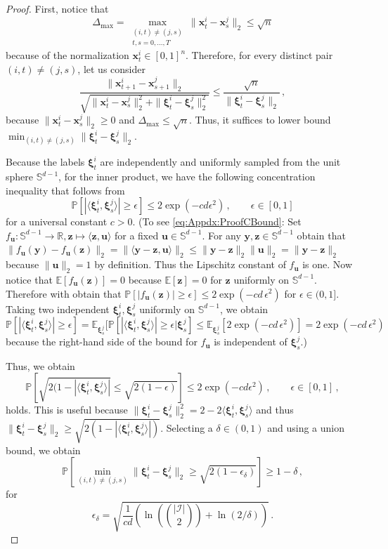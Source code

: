 \documentclass{article}
\theoremstyle{plain}
\theoremstyle{definition}
\theoremstyle{remark}
\newcommand{\bfxi}{{\bm \xi}}
\newcommand{\x}{\bm{x}}
\newcommand{\bfy}{\boldsymbol{y}}
\newcommand{\bfz}{\boldsymbol{z}}
\newcommand{\bfu}{\boldsymbol{u}}
\begin{document}
\begin{proof}
  First, notice that
  \[
    \Delta_{\text{max}} = \max_{\substack{(i, t) \neq (j, s)\\t,s = 0, \dots, T}} \|\x_t^i - \x_s^j\|_2 \leq \sqrt{n}
  \]
  because of the normalization $\x_t^i \in [0, 1]^n$.
  Therefore, for every distinct pair $(i, t) \neq (j, s)$, let us consider
  \[
    \frac{\|\x_{t + 1}^i - \x_{s + 1}^j\|_2}{ \sqrt{\|\x_t^i - \x_s^j\|_2^2 + \|\bfxi_t^i - \bfxi_s^j\|_2^2}} \leq \frac{\sqrt{n}}{\|\bfxi_t^i - \bfxi_s^j\|_2}\,,
  \]
  because $\|\x_t^i - \x_s^j\|_2 \geq 0$ and $\Delta_{\text{max}} \leq \sqrt{n}$. Thus, it suffices to lower bound $\min_{(i, t) \neq (j, s)} \|\bfxi_t^i - \bfxi_s^j\|_2$.

  Because the labels $\bfxi_t^i$ are independently and uniformly sampled from the unit sphere $\mathbb{S}^{d - 1}$, for the inner product, we have the following concentration inequality  that follows from \citep[Exercise~5.1.12]{Vershynin2018}
  \begin{equation}
    \label{eq:Appdx:ProofCBound}
    \mathbb{P}[|\langle \bfxi_t^i, \bfxi_s^j\rangle | \geq \epsilon] \leq 2 \exp\left(-cd \epsilon^2\right)\,,\qquad \epsilon \in [0, 1]
  \end{equation}
  for a universal constant $c > 0$. (To see \eqref{eq:Appdx:ProofCBound}: Set $f_{\bfu}: \mathbb{S}^{d - 1} \to \mathbb{R}, \bfz \mapsto \langle \bfz, \bfu\rangle$ for a fixed $\bfu \in \mathbb{S}^{d - 1}$. For any $\bfy, \bfz \in \mathbb{S}^{d - 1}$ obtain that $\|f_{\bfu}(\bfy) - f_{\bfu}(\bfz)\|_2 = \|\langle \bfy - \bfz, \bfu\rangle\|_2 \leq \|\bfy - \bfz\|_2\|\bfu\|_2 = \|\bfy - \bfz\|_2$ because $\|\bfu\|_2 = 1$ by definition. Thus the Lipschitz constant of $f_{\bfu}$ is one. Now notice that $\mathbb{E}[f_{\bfu}(\bfz)] = 0$ because $\mathbb{E}[\bfz] = 0$ for $\bfz$ uniformly on $\mathbb{S}^{d - 1}$. Therefore with \citep[Exercise~5.1.12]{Vershynin2018} obtain that $\mathbb{P}[|f_{\bfu}(\bfz)| \geq \epsilon] \leq 2 \exp(-cd\, \epsilon^2)$ for $\epsilon \in (0, 1]$. Taking two independent $\bfxi_t^i, \bfxi_s^j$ uniformly on $\mathbb{S}^{d - 1}$, we obtain $\mathbb{P}[|\langle \bfxi_t^i, \bfxi_s^j\rangle| \geq \epsilon] = \mathbb{E}_{\bfxi_s^j}[\mathbb{P}[|\langle \bfxi_t^i, \bfxi_s^j\rangle| \geq \epsilon| \bfxi_s^j ] \leq \mathbb{E}_{\bfxi_s^j}[2 \exp(-cd\, \epsilon^2)] = 2 \exp(-cd\, \epsilon^2)$ because the right-hand side of the bound for $f_{\bfu}$ is independent of $\bfxi_s^j$.)

    Thus, we obtain
    \[
      \mathbb{P}\left[\sqrt{2(1 - |\langle \bfxi_t^i, \bfxi_s^j\rangle|} \leq \sqrt{2(1 - \epsilon)}\right] \leq 2 \exp\left(-cd\epsilon^2\right)\,,\qquad \epsilon \in [0, 1]\,,
    \]
    holds. This is useful because $\|\bfxi_t^i - \bfxi_s^j\|_2^2 = 2 - 2 \langle \bfxi_t^i, \bfxi_s^j \rangle$ and thus $\|\bfxi_t^i - \bfxi_s^j\|_2 \geq \sqrt{2(1 - |\langle \bfxi_t^i, \bfxi_s^j\rangle|)}$. Selecting a $\delta \in (0, 1)$ and using a union bound, we obtain
    \[
      \mathbb{P}\left[\min_{(i, t) \neq (j, s)} \|\bfxi_t^i - \bfxi_s^j\|_2 \geq \sqrt{2(1 - \epsilon_{\delta})}\right] \geq 1 - \delta\,,
    \]
    for
    \[
      \epsilon_{\delta} = \sqrt{\frac{1}{cd}\left(\ln\left(\binom{|\mathcal{I}|}{2}\right) + \ln(2/\delta)\right)}\,.
    \]


\end{proof}
\end{document}
